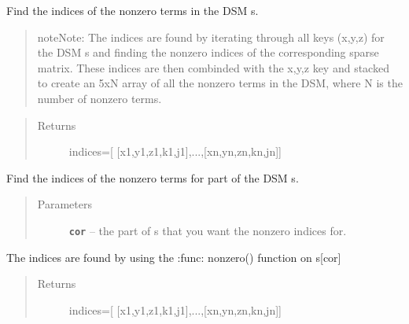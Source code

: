 \documentclass[letterpaper,10pt,english]{sphinxmanual}
\begin{document}
\begin{fulllineitems}
\begin{fulllineitems}
\end{fulllineitems}


\begin{fulllineitems}
\label{index:DictionarySparseMatrix.DS.nonzero}
Find the indices of the nonzero terms in the DSM s.
\begin{quote}

\begin{notice}{note}{Note:}
The indices are found by iterating through all keys (x,y,z)           for the DSM s and finding the nonzero indices of the           corresponding sparse matrix. These indices are then combinded           with the x,y,z key and stacked to create an 5xN array of all           the nonzero terms in the DSM, where N is the number of nonzero           terms.
\end{notice}
\end{quote}
\begin{quote}\begin{description}
\item[{Returns}] \leavevmode
indices={[} {[}x1,y1,z1,k1,j1{]},...,{[}xn,yn,zn,kn,jn{]}{]}

\end{description}\end{quote}

\end{fulllineitems}


\begin{fulllineitems}
\label{index:DictionarySparseMatrix.DS.nonzeroMat}
Find the indices of the nonzero terms for part of the DSM s.
\begin{quote}\begin{description}
\item[{Parameters}] \leavevmode
\textbf{\texttt{cor}} -- the part of s that you want the nonzero indices for.

\end{description}\end{quote}

The indices are found by using the :func: nonzero() function on s{[}cor{]}
\begin{quote}\begin{description}
\item[{Returns}] \leavevmode
indices={[} {[}x1,y1,z1,k1,j1{]},...,{[}xn,yn,zn,kn,jn{]}{]}


\end{description}
\end{quote}
\end{fulllineitems}
\end{fulllineitems}
\end{document}
